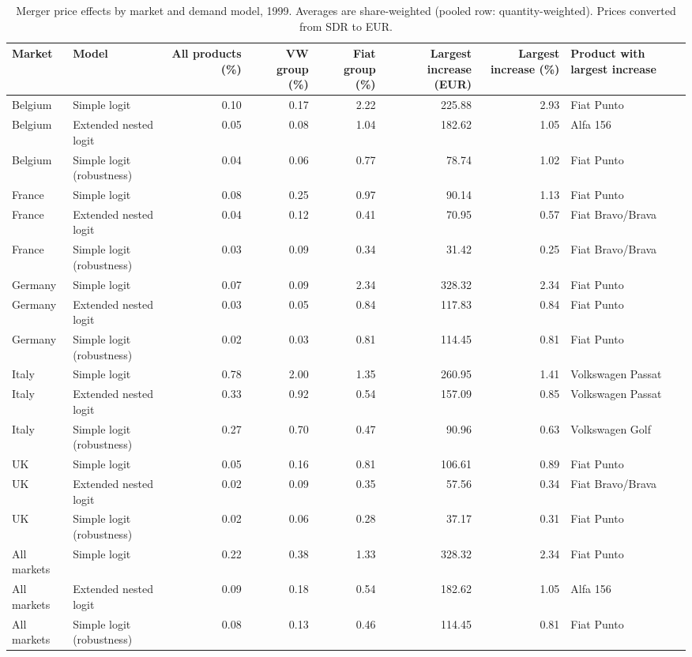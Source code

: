 \begin{table}
\caption{Merger price effects by market and demand model, 1999. Averages are share-weighted (pooled row: quantity-weighted). Prices converted from SDR to EUR.}
\label{tab:merger_overview}
\begin{tabular}{llrrrrrl}
\toprule
Market & Model & All products
(\%) & VW group
(\%) & Fiat group
(\%) & Largest
increase (EUR) & Largest
increase (\%) & Product with
largest increase \\
\midrule
Belgium & Simple logit & 0.10 & 0.17 & 2.22 & 225.88 & 2.93 & Fiat Punto \\
Belgium & Extended nested logit & 0.05 & 0.08 & 1.04 & 182.62 & 1.05 & Alfa 156 \\
Belgium & Simple logit (robustness) & 0.04 & 0.06 & 0.77 & 78.74 & 1.02 & Fiat Punto \\
France & Simple logit & 0.08 & 0.25 & 0.97 & 90.14 & 1.13 & Fiat Punto \\
France & Extended nested logit & 0.04 & 0.12 & 0.41 & 70.95 & 0.57 & Fiat Bravo/Brava \\
France & Simple logit (robustness) & 0.03 & 0.09 & 0.34 & 31.42 & 0.25 & Fiat Bravo/Brava \\
Germany & Simple logit & 0.07 & 0.09 & 2.34 & 328.32 & 2.34 & Fiat Punto \\
Germany & Extended nested logit & 0.03 & 0.05 & 0.84 & 117.83 & 0.84 & Fiat Punto \\
Germany & Simple logit (robustness) & 0.02 & 0.03 & 0.81 & 114.45 & 0.81 & Fiat Punto \\
Italy & Simple logit & 0.78 & 2.00 & 1.35 & 260.95 & 1.41 & Volkswagen Passat \\
Italy & Extended nested logit & 0.33 & 0.92 & 0.54 & 157.09 & 0.85 & Volkswagen Passat \\
Italy & Simple logit (robustness) & 0.27 & 0.70 & 0.47 & 90.96 & 0.63 & Volkswagen Golf \\
UK & Simple logit & 0.05 & 0.16 & 0.81 & 106.61 & 0.89 & Fiat Punto \\
UK & Extended nested logit & 0.02 & 0.09 & 0.35 & 57.56 & 0.34 & Fiat Bravo/Brava \\
UK & Simple logit (robustness) & 0.02 & 0.06 & 0.28 & 37.17 & 0.31 & Fiat Punto \\
All markets & Simple logit & 0.22 & 0.38 & 1.33 & 328.32 & 2.34 & Fiat Punto \\
All markets & Extended nested logit & 0.09 & 0.18 & 0.54 & 182.62 & 1.05 & Alfa 156 \\
All markets & Simple logit (robustness) & 0.08 & 0.13 & 0.46 & 114.45 & 0.81 & Fiat Punto \\
\bottomrule
\end{tabular}
\end{table}

